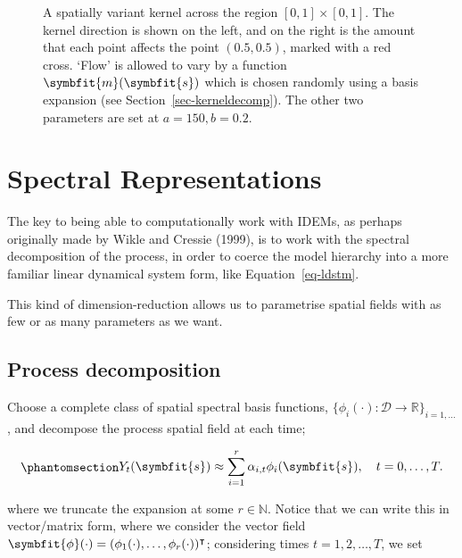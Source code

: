 \documentclass[
]{report}
\newcommand{\bv}[1]{\symbfit{#1}}
\theoremstyle{plain}
\theoremstyle{plain}
\theoremstyle{plain}
\theoremstyle{remark}
\begin{document}
\begin{figure}[h]
\begin{minipage}{0.50\linewidth}
\end{minipage}%

\caption{\label{fig-examplekernelvar}A spatially variant kernel across
the region \([0,1]\times[0,1]\). The kernel direction is shown on the
left, and on the right is the amount that each point affects the point
\((0.5,0.5)\), marked with a red cross. `Flow' is allowed to vary by a
function \(\bv m(\bv s)\) which is chosen randomly using a basis
expansion (see Section~\ref{sec-kerneldecomp}). The other two parameters
are set at \(a=150,b=0.2\).}

\end{figure}%

\chapter{Spectral Representations}\label{spectral-representations}

The key to being able to computationally work with IDEMs, as perhaps
originally made by Wikle and Cressie (1999), is to work with the
spectral decomposition of the process, in order to coerce the model
hierarchy into a more familiar linear dynamical system form, like
Equation~\ref{eq-ldstm}.

This kind of dimension-reduction allows us to parametrise spatial fields
with as few or as many parameters as we want.

\section{Process decomposition}\label{process-decomposition}

Choose a complete class of spatial spectral basis functions,
\(\{\phi_i(\cdot): \mathcal D\to \mathbb R\}_{i=1,\dots}\), and
decompose the process spatial field at each time;

\begin{equation}\phantomsection\label{eq-processdecomp}{\begin{split}
Y_t(\bv s) \approx \sum_{i=1}^{r} \alpha_{i,t} \phi_i(\bv s), \quad t=0,\dots,T.
\end{split}
}\end{equation}

where we truncate the expansion at some \(r\in\mathbb N\). Notice that
we can write this in vector/matrix form, where we consider the vector
field
\(\bv \phi(\cdot) = (\phi_1(\cdot),\dots, \phi_r(\cdot))^\intercal\);
considering times \(t=1,2,\dots, T\), we set
\end{document}
